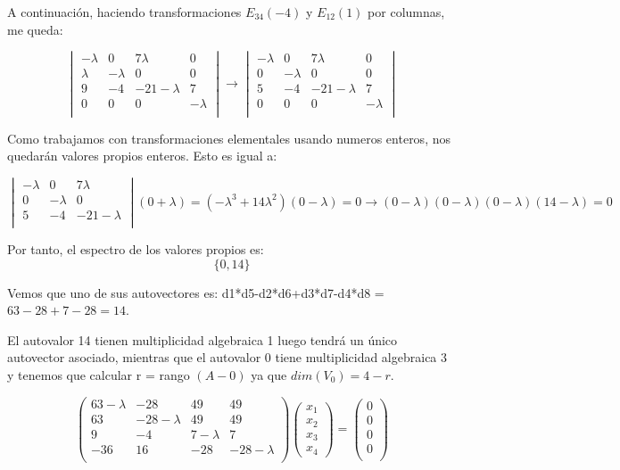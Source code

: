 \documentclass[11pt, a4paper]{article}
\newif\IfInSansMode
\theoremstyle{theorem-style}
\theoremstyle{definition-style}
\theoremstyle{remark-style}
\theoremstyle{example-style}
\begin{document}
A continuación, haciendo transformaciones $E_{34}(-4)$ y $E_{12}(1)$ por columnas, me queda:

$$\begin{vmatrix}
-\lambda & 0 & 7\lambda & 0\\
\lambda & -\lambda & 0 & 0\\
9 & -4 & -21-\lambda & 7\\
0 & 0 & 0 & -\lambda \\
\end{vmatrix} \rightarrow 
\begin{vmatrix}
-\lambda & 0 & 7\lambda & 0\\
0 & -\lambda & 0 & 0\\
5 & -4 & -21-\lambda & 7\\
0 & 0 & 0 & -\lambda \\ 
\end{vmatrix}$$

Como trabajamos con transformaciones elementales usando numeros enteros, nos quedarán valores propios enteros. Esto es igual a:

$$\begin{vmatrix}
-\lambda & 0 & 7\lambda \\
0 & -\lambda & 0 \\
5 & -4 & -21-\lambda \\ 
 \end{vmatrix}(0+\lambda)= (-\lambda^3+14\lambda^2)(0-\lambda) = 0 \rightarrow (0-\lambda)(0-\lambda)(0-\lambda)(14-\lambda)=0$$

Por tanto, el espectro de los valores propios es: $$\{0,14\}$$

Vemos que uno de sus autovectores es: d1*d5-d2*d6+d3*d7-d4*d8 = $63-28+7-28=14$.

El autovalor 14 tienen multiplicidad algebraica 1 luego tendrá un único autovector asociado, mientras que el autovalor 0 tiene multiplicidad algebraica 3 y tenemos que calcular r = rango $(A-0)$ ya que $dim(V_{0})=4-r$.

$$\begin{pmatrix}
63-\lambda & -28 & 49 & 49\\
63 & -28-\lambda & 49 & 49\\
9 & -4 & 7-\lambda & 7\\
-36 & 16 & -28 & -28-\lambda \\ 
\end{pmatrix}\begin{pmatrix}
x_1\\
x_2\\
x_3\\
x_4
\end{pmatrix}=
\begin{pmatrix}
0\\
0\\
0\\
0\\
\end{pmatrix}$$
\end{document}

